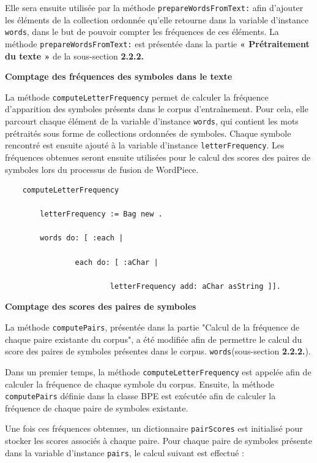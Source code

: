 \documentclass[12pt,a4paper]{report}
\begin{document}
	Elle sera ensuite utilisée par la méthode \texttt{prepareWordsFromText:} afin d’ajouter les éléments de la collection ordonnée qu’elle retourne dans la variable d’instance \texttt{words}, dans le but de pouvoir compter les fréquences de ces éléments. La méthode \texttt{prepareWordsFromText:} est présentée dans la partie \textbf{« Prétraitement du texte »} de la sous-section \textbf{2.2.2.}
	
	\textbf{Comptage des fréquences des symboles dans le texte}
	
	La méthode \texttt{computeLetterFrequency} permet de calculer la fréquence d’apparition des symboles présents dans le corpus d’entraînement. Pour cela, elle parcourt chaque élément de la variable d’instance \texttt{words}, qui contient les mots prétraités sous forme de collections ordonnées de symboles. Chaque symbole rencontré est ensuite ajouté à la variable d’instance \texttt{letterFrequency}.
	Les fréquences obtenues seront ensuite utilisées pour le calcul des scores des paires de symboles lors du processus de fusion de WordPiece.
	
	\begin{verbatim}
	computeLetterFrequency
				
		letterFrequency := Bag new .
			
		words do: [ :each |
		
				each do: [ :aChar |
				
						letterFrequency add: aChar asString ]].
	\end{verbatim}
	
	\textbf{Comptage des scores des paires de symboles}
	
	La méthode \texttt{computePairs}, présentée dans la partie "Calcul de la fréquence de chaque paire existante du corpus", a été modifiée afin de permettre le calcul du score des paires de symboles présentes dans le corpus. \texttt{words}(sous-section \textbf{2.2.2.}).
	
	Dans un premier temps, la méthode \texttt{computeLetterFrequency} est appelée afin de calculer la fréquence de chaque symbole du corpus. Ensuite, la méthode \texttt{computePairs} définie dans la classe BPE est exécutée afin de calculer la fréquence de chaque paire de symboles existante.
	
	Une fois ces fréquences obtenues, un dictionnaire \texttt{pairScores} est initialisé pour stocker les scores associés à chaque paire. Pour chaque paire de symboles présente dans la variable d’instance \texttt{pairs}, le calcul suivant est effectué :
	
\end{document}
